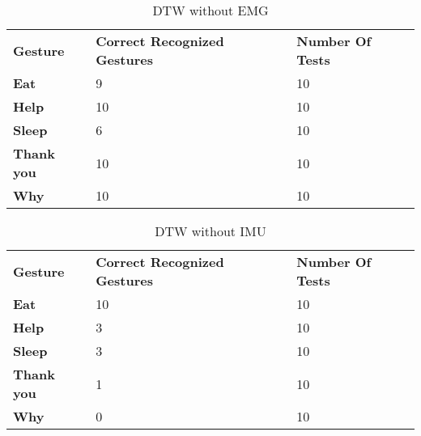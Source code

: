 \begin{table}[ht!]
\centering
    \begin{tabular}{ | l | p{4cm} | p{4cm}|}
        \hline
        \textbf{Gesture} & \textbf{Correct Recognized Gestures} & \textbf{Number Of Tests} \\ \Xhline{4\arrayrulewidth}
        
        \textbf{Eat} & 9 &  10 \\ \hline
        
        \textbf{Help}  & 10 &  10 \\ \hline
        
        \textbf{Sleep}  & 6 &  10 \\ \hline
        
        \textbf{Thank you}  & 10 &  10 \\ \hline
        
        \textbf{Why}  & 10 &  10 \\ \hline
    \end{tabular}
    \caption[DTW without EMG test]{DTW without EMG}
    \label{table:DTW_without_EMG_test}
\end{table}

\begin{table}[ht!]
\centering
    \begin{tabular}{ | l | p{4cm} | p{4cm}|}
        \hline
        \textbf{Gesture} & \textbf{Correct Recognized Gestures} & \textbf{Number Of Tests} \\ \Xhline{4\arrayrulewidth}
        
        \textbf{Eat} & 10 &  10 \\ \hline
        
        \textbf{Help}  & 3 &  10 \\ \hline
        
        \textbf{Sleep}  & 3 &  10 \\ \hline
        
        \textbf{Thank you}  & 1 &  10 \\ \hline
        
        \textbf{Why}  & 0 &  10 \\ \hline
    \end{tabular}
    \caption[DTW without IMU]{DTW without IMU}
    \label{table:DTW_without_IMU_test}
\end{table}

